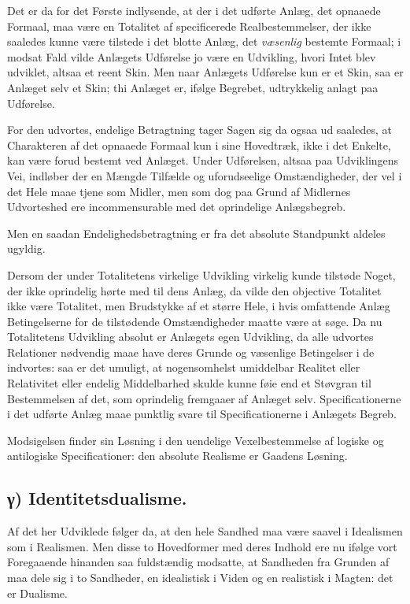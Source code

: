 \documentclass[12pt]{book}
\newcommand{\opage}[1]{\marginnote{\footnotesize\textit{[#1]}}}
\begin{document}
Det er da for det Første indlysende, at der i det udførte Anlæg, det
opnaaede Formaal, maa være en Totalitet af specificerede
Realbestemmelser, der ikke saaledes kunne være tilstede i det blotte
Anlæg, det \emph{væsenlig} bestemte Formaal;
\opage{71} i modsat Fald vilde Anlægets Udførelse jo være en Udvikling, hvori
Intet blev udviklet, altsaa et reent Skin. Men naar Anlægets
Udførelse kun er et Skin, saa er Anlæget selv et Skin; thi Anlæget
er, ifølge Begrebet, udtrykkelig anlagt paa Udførelse.

For den udvortes, endelige Betragtning tager Sagen sig da ogsaa ud
saaledes, at Charakteren af det opnaaede Formaal kun i sine
Hovedtræk, ikke i det Enkelte, kan være forud bestemt ved Anlæget.
Under Udførelsen, altsaa paa Udviklingens Vei, indløber der en
Mængde Tilfælde og uforudseelige Omstændigheder, der vel i det Hele
maae tjene som Midler, men som dog paa Grund af Midlernes
Udvorteshed ere incommensurable med det oprindelige Anlægsbegreb.

Men en saadan Endelighedsbetragtning er fra det absolute Standpunkt
aldeles ugyldig.

Dersom der under Totalitetens virkelige Udvikling virkelig kunde
tilstøde Noget, der ikke oprindelig hørte med til dens Anlæg, da
vilde den objective Totalitet ikke være Totalitet, men Brudstykke af
et større Hele, i hvis omfattende Anlæg Betingelserne for de
tilstødende Omstændigheder maatte være at søge. Da nu Totalitetens
Udvikling absolut er Anlægets egen Udvikling, da alle udvortes
Relationer nødvendig maae have deres Grunde og væsenlige Betingelser
i de indvortes: saa er det umuligt, at nogensomhelst umiddelbar
Realitet eller Relativitet eller endelig Middelbarhed skulde kunne
føie end et Støvgran til Bestemmelsen af det, som oprindelig
fremgaaer af Anlæget selv. Specificationerne i det udførte Anlæg
maae punktlig svare til Specificationerne i Anlægets Begreb.

Modsigelsen finder sin Løsning i den uendelige Vexelbestemmelse af
logiske og antilogiske Specificationer: den absolute Realisme er
Gaadens Løsning.

\subsection*{γ) Identitetsdualisme.}

Af det her Udviklede følger
\opage{72} da, at den hele Sandhed maa være saavel i Idealismen som i
Realismen. Men disse to Hovedformer med deres Indhold ere nu ifølge
vort Foregaaende hinanden saa fuldstændig modsatte, at Sandheden fra
Grunden af maa dele sig i to Sandheder, en idealistisk i Viden og en
realistisk i Magten: det er Dualisme.
\end{document}
